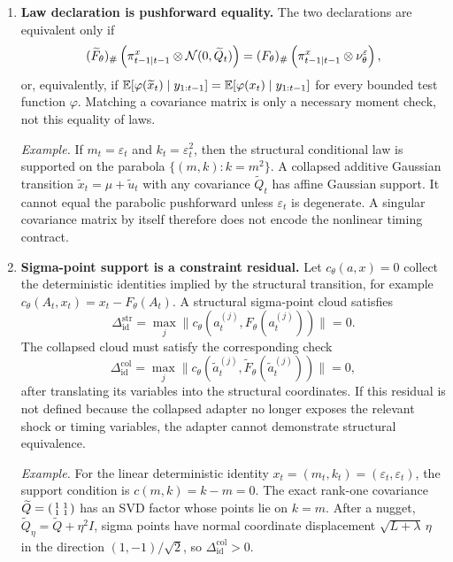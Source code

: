 \begin{enumerate}[label=(\roman*)]
  \item \textbf{Law declaration is pushforward equality.}  The two
    declarations are equivalent only if
    \[
      (\widetilde F_\theta)_\#
      \left(\pi_{t-1|t-1}^x\otimes\mathcal{N}(0,\widetilde Q_t)\right)
      =
      (F_\theta)_\#
      \left(\pi_{t-1|t-1}^x\otimes\nu_\theta^\varepsilon\right),
      \label{eq:bf-collapsed-law-equivalence}
    \]
    or, equivalently, if
    $\mathbb{E}[\varphi(\widetilde x_t)\mid y_{1:t-1}]
    =\mathbb{E}[\varphi(x_t)\mid y_{1:t-1}]$ for every bounded test function
    $\varphi$.  Matching a covariance matrix is only a necessary moment check,
    not this equality of laws.

    \emph{Example.}  If $m_t=\varepsilon_t$ and $k_t=\varepsilon_t^2$, then the
    structural conditional law is supported on the parabola
    $\{(m,k):k=m^2\}$.  A collapsed additive Gaussian transition
    $\widetilde x_t=\mu+\widetilde u_t$ with any covariance
    $\widetilde Q_t$ has affine Gaussian support.  It cannot equal the
    parabolic pushforward unless $\varepsilon_t$ is degenerate.  A singular
    covariance matrix by itself therefore does not encode the nonlinear timing
    contract.

  \item \textbf{Sigma-point support is a constraint residual.}  Let
    $c_\theta(a,x)=0$ collect the deterministic identities implied by the
    structural transition, for example
    $c_\theta(A_t,x_t)=x_t-F_\theta(A_t)$.  A structural sigma-point cloud
    satisfies
    \[
      \Delta_{\mathrm{id}}^{\mathrm{str}}
      =
      \max_j \|c_\theta(a_t^{(j)},F_\theta(a_t^{(j)}))\|
      =0.
    \]
    The collapsed cloud must satisfy the corresponding check
    \[
      \Delta_{\mathrm{id}}^{\mathrm{col}}
      =
      \max_j
      \|c_\theta(\widetilde a_t^{(j)},
        \widetilde F_\theta(\widetilde a_t^{(j)}))\|
      =0,
      \label{eq:bf-collapsed-identity-residual}
    \]
    after translating its variables into the structural coordinates.  If this
    residual is not defined because the collapsed adapter no longer exposes the
    relevant shock or timing variables, the adapter cannot demonstrate
    structural equivalence.

    \emph{Example.}  For the linear deterministic identity
    $x_t=(m_t,k_t)=(\varepsilon_t,\varepsilon_t)$, the support condition is
    $c(m,k)=k-m=0$.  The exact rank-one covariance
    $\widetilde Q=\begin{psmallmatrix}1&1\\1&1\end{psmallmatrix}$ has an SVD
    factor whose points lie on $k=m$.  After a nugget,
    $\widetilde Q_\eta=\widetilde Q+\eta^2I$, sigma points have normal
    coordinate displacement $\sqrt{L+\lambda}\,\eta$ in the direction
    $(1,-1)/\sqrt2$, so $\Delta_{\mathrm{id}}^{\mathrm{col}}>0$.


\end{enumerate}
